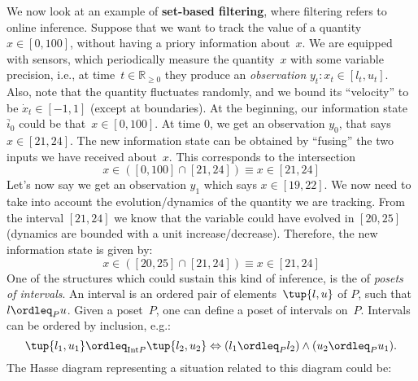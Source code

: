\begin{example}
We now look at an example of \textbf{set-based filtering}, where filtering refers to online inference. Suppose that we want to track the value of a quantity~$x\in [0,100]$, without having a priory information about~$x$. We are equipped with sensors, which periodically measure the quantity~$x$ with some variable precision, i.e., at time~$t\in \mathbb{R}_{\geq 0}$ they produce an \emph{observation} $y_t\colon x_t\in [l_t,u_t]$. Also, note that the quantity fluctuates randomly, and we bound its ``velocity'' to be $\dot{x}_t\in [-1,1]$ (except at boundaries). At the beginning, our information state $\bar{i}_0$ could be that~$x\in [0,100]$. At time 0, we get an observation $y_0$, that says $x\in [21,24]$. The new information state can be obtained by ``fusing'' the two inputs we have received about~$x$. This corresponds to the intersection
\begin{equation*}
    x\in \left( [0,100] \cap [21,24]\right)\equiv x\in [21,24]
\end{equation*}
Let's now say we get an observation $y_1$ which says $x\in [19,22]$. We now need to take into account the evolution/dynamics of the quantity we are tracking. From the interval $[21,24]$ we know that the variable could have evolved in $[20,25]$ (dynamics are bounded with a unit increase/decrease). Therefore, the new information state is given by:
\begin{equation*}
    x\in \left( [20,25] \cap [21,24]\right)\equiv x\in [21,24]
\end{equation*}
One of the structures which could sustain this kind of inference, is the of \emph{posets of intervals}.
An interval is an ordered pair of elements~$\tup{l,u}$ of $P$, such that $l\ordleq_P u$. Given a poset~$P$, one can define a poset of intervals on~$P$. Intervals can be ordered by inclusion, e.g.:
\begin{equation*}
    \tup{l_1,u_1}\ordleq_{\mathrm{Int} P}\tup{l_2,u_2} \Leftrightarrow (l_1\ordleq_P l_2)\wedge (u_2\ordleq_P u_1).
\end{equation*}
The Hasse diagram representing a situation related to this diagram could be:
\begin{center}
\end{center}
\end{example}

